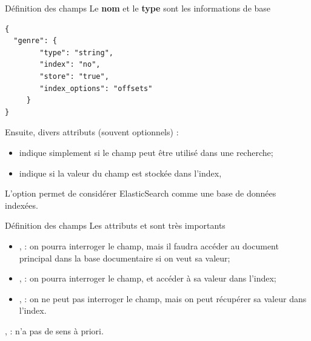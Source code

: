\begin{frame}[fragile]{Définition des champs}
Le {\bf nom} et le {\bf type} sont les informations de base
\begin{verbatim} 
{
  "genre": { 
		"type": "string",
		"index": "no",
		"store": "true",
		"index_options": "offsets"
     }
}
\end{verbatim}

\vfill
Ensuite, divers attributs (souvent optionnels) :
    \begin{itemize}
      \item {} indique simplement si le champ peut être utilisé dans une recherche;  
      \item {} indique si la \alert{valeur} du champ est \alert{stockée} dans l'index,
         

    \end{itemize}
\vfill
   
\begin{blocgauche}
 L'option  permet de considérer ElasticSearch comme une base de données
 indexées.  
\end{blocgauche}
\end{frame}

\begin{frame}[fragile]{Définition des champs}
 Les attributs   et  sont très importants
\vfill
    \begin{itemize}
      \item {}, : on pourra interroger
      le champ, mais il faudra accéder au document principal dans la  base documentaire si on veut sa valeur;
    \item {}, : on pourra interroger
      le champ, \alert{et} accéder à sa valeur dans l'index;
    \item {}, : on ne peut pas interroger le champ, mais
      on peut récupérer sa valeur dans l'index.
    \end{itemize}

\begin{blocgauche}
, : n'a pas de sens à priori.
\end{blocgauche}
\end{frame}




